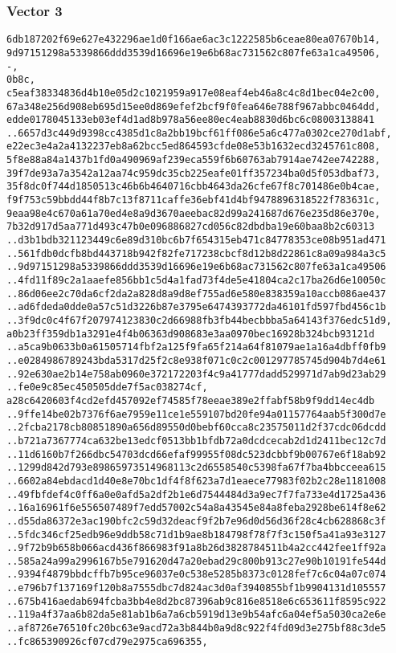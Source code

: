 \documentclass[
]{article}
\begin{document}
\hypertarget{vector-3-2}{%
\subsubsection{Vector 3}\label{vector-3-2}}

\begin{verbatim}
6db187202f69e627e432296ae1d0f166ae6ac3c1222585b6ceae80ea07670b14,
9d97151298a5339866ddd3539d16696e19e6b68ac731562c807fe63a1ca49506,
-,
0b8c,
c5eaf38334836d4b10e05d2c1021959a917e08eaf4eb46a8c4c8d1bec04e2c00,
67a348e256d908eb695d15ee0d869efef2bcf9f0fea646e788f967abbc0464dd,
edde0178045133eb03ef4d1ad8b978a56ee80ec4eab8830d6bc6c08003138841
..6657d3c449d9398cc4385d1c8a2bb19bcf61ff086e5a6c477a0302ce270d1abf,
e22ec3e4a2a4132237eb8a62bcc5ed864593cfde08e53b1632ecd3245761c808,
5f8e88a84a1437b1fd0a490969af239eca559f6b60763ab7914ae742ee742288,
39f7de93a7a3542a12aa74c959dc35cb225eafe01ff357234ba0d5f053dbaf73,
35f8dc0f744d1850513c46b6b4640716cbb4643da26cfe67f8c701486e0b4cae,
f9f753c59bbdd44f8b7c13f8711caffe36ebf41d4bf9478896318522f783631c,
9eaa98e4c670a61a70ed4e8a9d3670aeebac82d99a241687d676e235d86e370e,
7b32d917d5aa771d493c47b0e096886827cd056c82dbdba19e60baa8b2c60313
..d3b1bdb321123449c6e89d310bc6b7f654315eb471c84778353ce08b951ad471
..561fdb0dcfb8bd443718b942f82fe717238cbcf8d12b8d22861c8a09a984a3c5
..9d97151298a5339866ddd3539d16696e19e6b68ac731562c807fe63a1ca49506
..4fd11f89c2a1aaefe856bb1c5d4a1fad73f4de5e41804ca2c17ba26d6e10050c
..86d06ee2c70da6cf2da2a828d8a9d8ef755ad6e580e838359a10accb086ae437
..ad6fdeda0dde0a57c51d3226b87e3795e6474393772da46101fd597fbd456c1b
..3f9dc0c4f67f207974123830c2d66988fb3fb44becbbba5a64143f376edc51d9,
a0b23ff359db1a3291e4f4b06363d908683e3aa0970bec16928b324bcb93121d
..a5ca9b0633b0a61505714fbf2a125f9fa65f214a64f81079ae1a16a4dbff0fb9
..e0284986789243bda5317d25f2c8e938f071c0c2c001297785745d904b7d4e61
..92e630ae2b14e758ab0960e372172203f4c9a41777dadd529971d7ab9d23ab29
..fe0e9c85ec450505dde7f5ac038274cf,
a28c6420603f4cd2efd457092ef74585f78eeae389e2ffabf58b9f9dd14ec4db
..9ffe14be02b7376f6ae7959e11ce1e559107bd20fe94a01157764aab5f300d7e
..2fcba2178cb80851890a656d89550d0bebf60cca8c23575011d2f37cdc06dcdd
..b721a7367774ca632be13edcf0513bb1bfdb72a0dcdcecab2d1d2411bec12c7d
..11d6160b7f266dbc54703dcd66efaf99955f08dc523dcbbf9b00767e6f18ab92
..1299d842d793e89865973514968113c2d6558540c5398fa67f7ba4bbcceea615
..6602a84ebdacd1d40e8e70bc1df4f8f623a7d1eaece77983f02b2c28e1181008
..49fbfdef4c0ff6a0e0afd5a2df2b1e6d7544484d3a9ec7f7fa733e4d1725a436
..16a16961f6e556507489f7edd57002c54a8a43545e84a8feba2928be614f8e62
..d55da86372e3ac190bfc2c59d32deacf9f2b7e96d0d56d36f28c4cb628868c3f
..5fdc346cf25edb96e9ddb58c71d1b9ae8b184798f78f7f3c150f5a41a93e3127
..9f72b9b658b066acd436f866983f91a8b26d3828784511b4a2cc442fee1ff92a
..585a24a99a2996167b5e791620d47a20ebad29c800b913c27e90b10191fe544d
..9394f4879bbdcffb7b95ce96037e0c538e5285b8373c0128fef7c6c04a07c074
..e796b7f137169f120b8a7555dbc7d824ac3d0af3940855bf1b9904131d105557
..675b416aedab694fcba3bb4e8d2bc87396ab9c816e8518e6c653611f8595c922
..119a4f37aa6b82da5e81ab1b6a7a6cb5919d13e9b54afc6a04ef5a5030ca2e6e
..af8726e76510fc20bc63e9acd72a3b844b0a9d8c922f4fd09d3e275bf88c3de5
..fc865390926cf07cd79e2975ca696355,
\end{verbatim}
\end{document}
